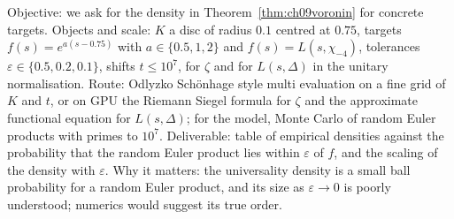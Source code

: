 \begin{compproblem}
Objective: we ask for the density in Theorem~\ref{thm:ch09voronin} for concrete targets. Objects and scale: $K$ a disc of radius $0.1$ centred at $0.75$, targets $f(s) = e^{a(s-0.75)}$ with $a\in\{0.5,1,2\}$ and $f(s) = L(s,\chi_{-4})$, tolerances $\varepsilon\in\{0.5,0.2,0.1\}$, shifts $t\le10^7$, for $\zeta$ and for $L(s,\Delta)$ in the unitary normalisation. Route: Odlyzko Sch\"onhage style multi evaluation on a fine grid of $K$ and $t$, or on GPU the Riemann Siegel formula for $\zeta$ and the approximate functional equation for $L(s,\Delta)$; for the model, Monte Carlo of random Euler products with primes to $10^7$. Deliverable: table of empirical densities against the probability that the random Euler product lies within $\varepsilon$ of $f$, and the scaling of the density with $\varepsilon$. Why it matters: the universality density is a small ball probability for a random Euler product, and its size as $\varepsilon\to0$ is poorly understood; numerics would suggest its true order.
\end{compproblem}
